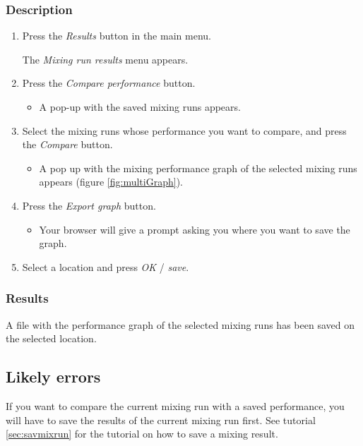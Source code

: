 \subsubsection{Description}
\begin{enumerate}
	\item Press the \emph{Results} button in the main menu.
		\begin{itemize}
            The \emph{Mixing run results} menu appears.
		\end{itemize}
	\item Press the \emph{Compare performance} button.
		\begin{itemize}
            \item A pop-up with the saved mixing runs appears.
		\end{itemize}
	\item Select the mixing runs whose performance you want to compare, and press the \emph{Compare} button. \label{item:exportMultiGraphComp}
		\begin{itemize}
            \item A pop up with the mixing performance graph of the selected mixing runs appears (figure \ref{fig:multiGraph}).
		\end{itemize}
	\item Press the \emph{Export graph} button.
        \begin{itemize}
            \item Your browser will give a prompt asking you where you want to save the graph.
        \end{itemize}
	\item  Select a location and press \emph{OK} / \emph{save}.
\end{enumerate}


\subsubsection{Results}
A file with the performance graph of the selected mixing runs has been saved on the selected location.

\subsection{Likely errors}
If you want to compare the current mixing run with a saved performance, you will have to save the results of the current mixing run first. See tutorial \ref{sec:savmixrun} for the tutorial on how to save a mixing result.

